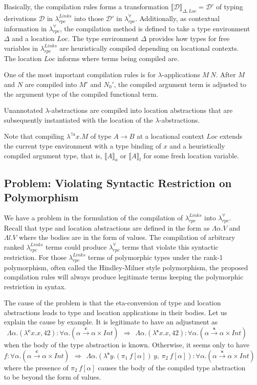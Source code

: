 \documentclass[a4paper]{article}
\theoremstyle{plain}
\theoremstyle{definition}
\newcommand{\polyrpc}{$\lambda_{rpc}^{\forall}$\xspace}
\newcommand{\linksrpc}{$\lambda_{rpc}^{Links}$\xspace}
\newcommand{\client}{\textbf{c}}
\newcommand{\server}{\textbf{s}}
\newcommand{\lamL}[3]{\lambda^{#1}#2.#3}
\newcommand{\funL}[1]{\xrightarrow{#1}}
\newcommand{\linkstycomp}[2]{\llbracket#1\rrbracket_{#2}}
\newcommand{\adjcomp}[4]{#1:#2 \Rightarrow #3:#4}
\newcommand{\judgcomp}[2]{\llbracket#1\rrbracket_{#2}}
\newcommand{\Loc}{Loc}
\begin{document}
%
Basically, the compilation rules forms a transformation
$\judgcomp{\mathcal{D}}{\Delta,\Loc}=\mathcal{D'}$ of typing derivations
$\mathcal{D}$ in \linksrpc into those $\mathcal{D'}$ in \polyrpc.
%
Additionally, as contextual information in \polyrpc, the
compilation method is defined to take a type environment $\Delta$ and a
location $\Loc$.
%
The type environment $\Delta$ provides how types for free variables in
\linksrpc are heuristically compiled depending on locational contexts.
%
The location $\Loc$ informs where terms being compiled are.


%
One of the most important compilation rules is for $\lambda$-applications $M
\ N$.
%
After $M$ and $N$ are compiled into $M'$ and $N_0'$, the compiled
argument term is adjusted to the argument type of the compiled
functional term.

%
Unannotated $\lambda$-abstractions are compiled into location
abstractions that are subsequently instantiated with the location of
the $\lambda$-abstractions.

%
Note that compiling $\lamL{?a}{x}{M}$ of type $A \rightarrow B$ at a
locational context $\Loc$ extends the current type environment with a
type binding of $x$ and a heuristically compiled argument type, that
is, $\linkstycomp{A}{a}$ or $\linkstycomp{A}{l}$ for some fresh location
variable.

\subsection{Problem: Violating Syntactic Restriction on Polymorphism}

%
We have a problem in the formulation of the compilation of \linksrpc
into \polyrpc.
%
Recall that type and location abstractions are defined in the form as
$\Lambda\alpha.V$ and $\Lambda l.V$ where the bodies are in the form
of values.
%
The compilation of arbitrary ranked \linksrpc terms could produce
\polyrpc terms that violate this syntactic restriction.
%
For those \linksrpc terms of polymorphic types under the rank-1
polymorphism, often called the Hindley-Milner style polymorphism, the
proposed compilation rules will always produce legitimate terms
keeping the polymorphic restriction in syntax.

%
The cause of the problem is that the eta-conversion of type and
location abstractions leads to type and location applications in their
bodies.
%
Let us explain the cause by example.
%
It is legitimate to have an adjustment as
\[
\adjcomp{\Lambda\alpha.(\lamL{\client}{x}{x}, 42)}
        {\forall\alpha.(\alpha\funL{\client}\alpha\times Int) \ \ }
        {\ \ \Lambda\alpha.(\lamL{\server}{x}{x}, 42)}
        {\forall\alpha.(\alpha\funL{\server}\alpha\times Int)}
\]
when the body of the type abstraction is known.
%
Otherwise, it seems only to have
\[
\adjcomp{f}
        {\forall\alpha.(\alpha\funL{\client}\alpha\times Int) \ \ }
        {\ \ \Lambda\alpha.(\lamL{\server}{y}{ (\pi_1 \ f[\alpha]) \ y}, \ \pi_2 \ f[\alpha])}
        {\forall\alpha.(\alpha\funL{\server}\alpha\times Int)}
\]
where the presence of $\pi_2 \ f[\alpha]$ causes the body of the
compiled type abstraction to be beyond the form of values.
\end{document}
